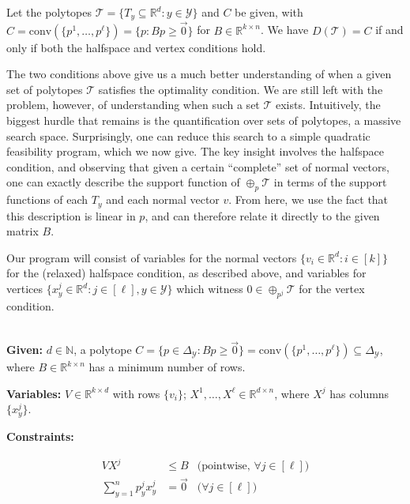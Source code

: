 \documentclass[anon]{colt2020} %
\newcommand{\reals}{\mathbb{R}}
\newcommand{\simplex}{\Delta_\Y}
\newcommand{\T}{\mathcal{T}}
\newcommand{\Y}{\mathcal{Y}}
\newcommand{\conv}{\mathrm{conv}}
\begin{document}
\begin{theorem} \label{thm:vertex-halfspace-opt}
  Let the polytopes $\T = \{T_y \subseteq \reals^d : y \in \Y\}$ and $C$ be given, with $C = \conv(\{p^1,\ldots,p^{\ell}\}) = \{p: Bp \geq \vec 0\}$ for $B \in \reals^{k \times n}$.
  We have $D(\T) = C$ if and only if both the halfspace and vertex conditions hold.
\end{theorem}

The two conditions above give us a much better understanding of when a given set of polytopes $\T$ satisfies the optimality condition.
We are still left with the problem, however, of understanding when such a set $\T$ exists.
Intuitively, the biggest hurdle that remains is the quantification over sets of polytopes, a massive search space.
Surprisingly, one can reduce this search to a simple quadratic feasibility program, which we now give.
The key insight involves the halfspace condition, and observing that given a certain ``complete'' set of normal vectors, one can exactly describe the support function of $\oplus_p\T$ in terms of the support functions of each $T_y$ and each normal vector $v$.
From here, we use the fact that this description is linear in $p$, and can therefore relate it directly to the given matrix $B$.

Our program will consist of variables for the normal vectors $\{v_i \in \reals^d : i \in [k]\}$ for the (relaxed) halfspace condition, as described above, and variables for vertices $\{x^j_y \in \reals^d : j \in [\ell], y \in \Y\}$ which witness $0\in\oplus_{p^j} \T$ for the vertex condition.

\begin{definition} \label{def:qfp} ~ \\
  \indent 
  \textbf{Given:} $d \in \mathbb{N}$, a polytope $C = \{p \in \simplex : Bp \geq \vec 0\} = \conv(\{p^1, \ldots, p^\ell\}) \subseteq \simplex$, where $B \in \reals^{k \times n}$ has a minimum number of rows.

  \textbf{Variables:} $V \in \reals^{k \times d}$ with rows $\{v_i\}$; $X^1,\ldots,X^{\ell} \in \reals^{d \times n}$, where $X^j$ has columns $\{x^j_y\}$.

  \textbf{Constraints:}

  \vspace{-3.2em}
    \begin{align}
      V X^j                     &\leq B    & \text{(pointwise, $\forall j \in [\ell]$)}  \label{eqn:qp-constr-1} \\
      \sum_{y=1}^n p^j_y x^j_y &= \vec 0  & \text{($\forall j \in [\ell]$)}    \label{eqn:qp-constr-2}
    \end{align}
\end{definition}
\end{document}
